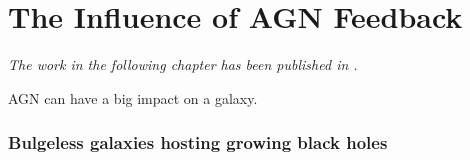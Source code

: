 \chapter{The Influence of AGN Feedback}

\emph{The work in the following chapter has been published in \citet{smethurst16}.}

AGN can have a big impact on a galaxy. 

\subsection{Bulgeless galaxies hosting growing black holes}